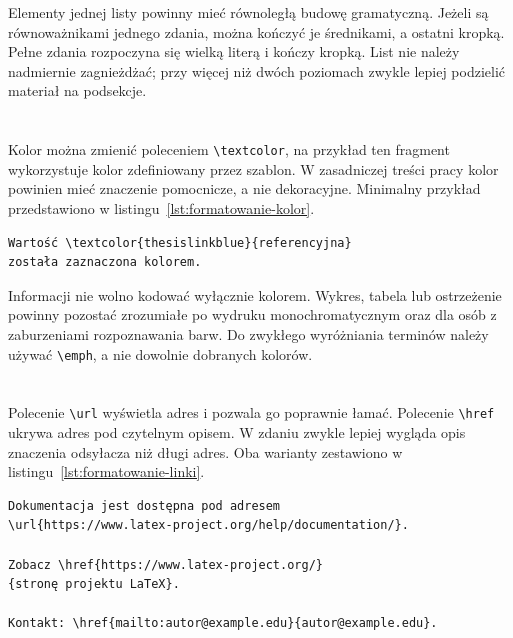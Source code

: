 Elementy jednej listy powinny mieć równoległą budowę gramatyczną. Jeżeli są równoważnikami jednego zdania, można kończyć je średnikami, a ostatni kropką. Pełne zdania rozpoczyna się wielką literą i kończy kropką. List nie należy nadmiernie zagnieżdżać; przy więcej niż dwóch poziomach zwykle lepiej podzielić materiał na podsekcje.

\section{}

Kolor można zmienić poleceniem \verb|\textcolor|, na przykład \textcolor{thesislinkblue}{ten fragment wykorzystuje kolor zdefiniowany przez szablon}. W zasadniczej treści pracy kolor powinien mieć znaczenie pomocnicze, a nie dekoracyjne. Minimalny przykład przedstawiono w listingu~\ref{lst:formatowanie-kolor}.

\begin{lstlisting}[style=thesis,caption={Zmiana koloru krótkiego fragmentu},label={lst:formatowanie-kolor}]
Wartość \textcolor{thesislinkblue}{referencyjna}
została zaznaczona kolorem.
\end{lstlisting}

Informacji nie wolno kodować wyłącznie kolorem. Wykres, tabela lub ostrzeżenie powinny pozostać zrozumiałe po wydruku monochromatycznym oraz dla osób z zaburzeniami rozpoznawania barw. Do zwykłego wyróżniania terminów należy używać \verb|\emph|, a nie dowolnie dobranych kolorów.

\section{}

Polecenie \verb|\url| wyświetla adres i pozwala go poprawnie łamać. Polecenie \verb|\href| ukrywa adres pod czytelnym opisem. W zdaniu zwykle lepiej wygląda opis znaczenia odsyłacza niż długi adres. Oba warianty zestawiono w listingu~\ref{lst:formatowanie-linki}.

\begin{lstlisting}[style=thesis,caption={Adres internetowy i opisany odsyłacz},label={lst:formatowanie-linki}]
Dokumentacja jest dostępna pod adresem
\url{https://www.latex-project.org/help/documentation/}.

Zobacz \href{https://www.latex-project.org/}
{stronę projektu LaTeX}.

Kontakt: \href{mailto:autor@example.edu}{autor@example.edu}.
\end{lstlisting}

